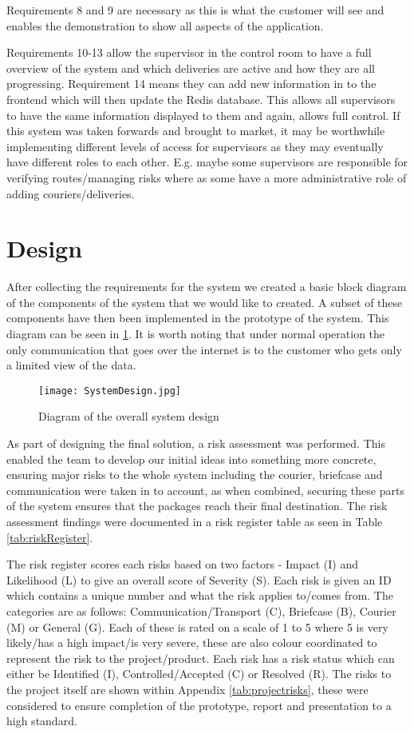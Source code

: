 Requirements 8 and 9 are necessary as this is what the customer will see and enables the demonstration to show all aspects of the application.

Requirements 10-13 allow the supervisor in the control room to have a full overview of the system and which deliveries are active and how they are all progressing. Requirement 14 means they can add new information in to the frontend which will then update the Redis database. This allows all supervisors to have the same information displayed to them and again, allows full control. If this system was taken forwards and brought to market, it may be worthwhile implementing different levels of access for supervisors as they may eventually have different roles to each other. E.g. maybe some supervisors are responsible for verifying routes/managing risks where as some have a more administrative role of adding couriers/deliveries.




\section{Design}

After collecting the requirements for the system we created a basic block diagram of the components of the system that we would like to created. A subset of these components have then been implemented in the prototype of the system. This diagram can be seen in \ref{fig:SystemDesign}. It is worth noting that under normal operation the only communication that goes over the internet is to the customer who gets only a limited view of the data. 

\begin{figure}[h]
\texttt{[image: SystemDesign.jpg]}
    \centering
    \caption{Diagram of the overall system design}
    \label{fig:SystemDesign}
\end{figure}

As part of designing the final solution, a risk assessment was performed. This enabled the team to develop our initial ideas into something more concrete, ensuring major risks to the whole system including the courier, briefcase and communication were taken in to account, as when combined, securing these parts of the system ensures that the packages reach their final destination. The risk assessment findings were documented in a risk register table as seen in Table \ref{tab:riskRegister}.

The risk register scores each risks based on two factors - Impact (I) and Likelihood (L) to give an overall score of Severity (S). Each risk is given an ID which contains a unique number and what the risk applies to/comes from. The categories are as follows: Communication/Transport (C), Briefcase (B), Courier  (M) or General (G). Each of these is rated on a scale of 1 to 5 where 5 is very likely/has a high impact/is very severe, these are also colour coordinated to represent the risk to the project/product. Each risk has a risk status which can either be Identified (I), Controlled/Accepted (C) or Resolved (R). The risks to the project itself are shown within Appendix \ref{tab:projectrisks}, these were considered to ensure completion of the prototype, report and presentation to a high standard.


